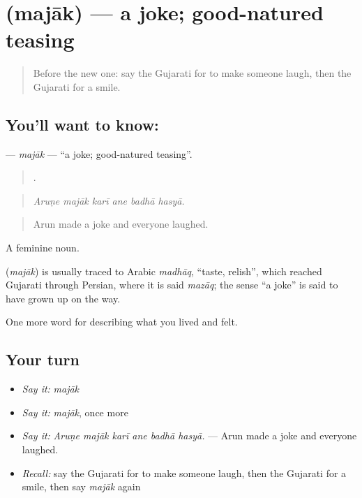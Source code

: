 \section[\texorpdfstring{\gu{મજાક} (majāk)}{મજાક (majāk)}]{ (majāk) — a joke; good-natured teasing}

\label{lesson:GU-C448-majak}



\begin{quote}
Before the new one: say the Gujarati for to make someone laugh, then the Gujarati for a smile.
\end{quote}

\subsection*{You'll want to know: }
\textbf{} — \emph{majāk} — \textquotedblleft{}a joke; good-natured teasing\textquotedblright{}.

\begin{quote}
     .
\end{quote}

\begin{quote}
\emph{Aruṇe majāk karī ane badhā hasyā.}
\end{quote}

\begin{quote}
Arun made a joke and everyone laughed.
\end{quote}

A feminine noun.

\begin{cousinweb}
\textbf{} (\emph{majāk}) is usually traced to Arabic \emph{madhāq}, \textquotedblleft{}taste, relish\textquotedblright{}, which reached Gujarati through Persian, where it is said \emph{mazāq}; the sense \textquotedblleft{}a joke\textquotedblright{} is said to have grown up on the way.
\end{cousinweb}

\begin{grammarlens}[title={What you've built}]
One more word for describing what you lived and felt.
\end{grammarlens}

\subsection*{Your turn}
\begin{itemize}
\raggedright
  \item \emph{Say it:} \emph{majāk}
  \item \emph{Say it:} \emph{majāk}, once more
  \item \emph{Say it:} \emph{Aruṇe majāk karī ane badhā hasyā.} — Arun made a joke and everyone laughed.
  \item \emph{Recall:} say the Gujarati for to make someone laugh, then the Gujarati for a smile, then say \emph{majāk} again
\end{itemize}


